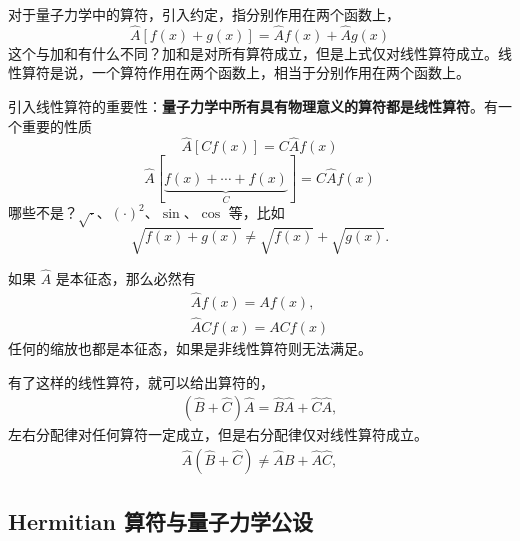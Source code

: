 对于量子力学中的算符，引入约定，指分别作用在两个函数上，
\begin{equation}
    \hat A [f(x) + g(x)] = \hat A f(x) + \hat A g(x)
\end{equation}
这个与加和有什么不同？加和是对所有算符成立，但是上式仅对线性算符成立。线性算符是说，一个算符作用在两个函数上，相当于分别作用在两个函数上。

引入线性算符的重要性：\textbf{量子力学中所有具有物理意义的算符都是线性算符}。有一个重要的性质
\begin{equation}
    \hat A [C f(x)] = C\hat A f(x)
\end{equation}
\begin{equation}
    \hat A[ \underbrace{f(x) + \cdots + f(x)}_{C} ] = C\hat A f(x)
\end{equation}
哪些不是？$\sqrt{\cdot}$、$(\cdot)^2$、$\sin$、$\cos$ 等，比如
\begin{equation}
    \sqrt{f(x) + g(x)} \neq \sqrt{f(x)} + \sqrt{g(x)}. 
\end{equation}


如果 $\hat A$ 是本征态，那么必然有
\begin{eqnarray}
    \hat A f(x) = A f(x), \\
    \hat A C f(x) = AC f(x)
\end{eqnarray}
任何的缩放也都是本征态，如果是非线性算符则无法满足。

有了这样的线性算符，就可以给出算符的，
\begin{eqnarray}
    (\hat B + \hat C) \hat A = \hat B \hat A + \hat C \hat A,
\end{eqnarray}
左右分配律对任何算符一定成立，但是右分配律仅对线性算符成立。
\begin{eqnarray}
    \hat A (\hat B + \hat C)  \neq \hat A \hat B + \hat A \hat C,
\end{eqnarray}

\subsection{Hermitian 算符与量子力学公设}

